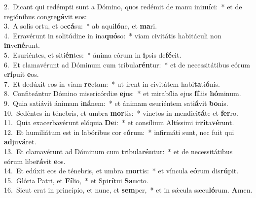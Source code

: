 {2.~}Dicant qui redémpti sunt a Dómino, quos redémit de manu ini\textbf{mí}ci:~* et de regiónibus congre\textbf{gá}vit \textbf{e}os:\\
{3.~}A solis ortu, et oc\textbf{cá}su:~* ab aqui\textbf{ló}ne, et \textbf{ma}ri.\\
{4.~}Erravérunt in solitúdine in ina\textbf{quó}so:~* viam civitátis habitáculi non \textbf{in}ve\textbf{né}runt.\\
{5.~}Esuriéntes, et siti\textbf{én}tes:~* ánima eórum in \textbf{i}psis de\textbf{fé}cit.\\
{6.~}Et clamavérunt ad Dóminum cum tribula\textbf{rén}tur:~* et de necessitátibus eórum e\textbf{rí}puit \textbf{e}os.\\
{7.~}Et dedúxit eos in viam \textbf{re}ctam:~* ut irent in civitátem habi\textbf{ta}ti\textbf{ó}nis.\\
{8.~}Confiteántur Dómino misericórdiæ \textbf{e}jus:~* et mirabília ejus \textbf{fí}liis \textbf{hó}minum.\\
{9.~}Quia satiávit ánimam i\textbf{ná}nem:~* et ánimam esuriéntem sati\textbf{á}vit \textbf{bo}nis.\\
{10.~}Sedéntes in ténebris, et umbra \textbf{mor}tis:~* vinctos in mendici\textbf{tá}te et \textbf{fer}ro.\\
{11.~}Quia exacerbavérunt elóquia \textbf{De}i:~* et consílium Altíssimi ir\textbf{ri}ta\textbf{vé}runt.\\
{12.~}Et humiliátum est in labóribus cor e\textbf{ó}rum:~* infirmáti sunt, nec fuit qui \textbf{ad}ju\textbf{vá}ret.\\
{13.~}Et clamavérunt ad Dóminum cum tribula\textbf{rén}tur:~* et de necessitátibus eórum libe\textbf{rá}vit \textbf{e}os.\\
{14.~}Et edúxit eos de ténebris, et umbra \textbf{mor}tis:~* et víncula e\textbf{ó}rum dis\textbf{rú}pit.\\
{15.~}Glória Patri, et \textbf{Fí}lio,~* et Spi\textbf{rí}tui \textbf{San}cto.\\
{16.~}Sicut erat in princípio, et nunc, et \textbf{sem}per,~* et in sǽcula sæcu\textbf{ló}rum. \textbf{A}men.\\

